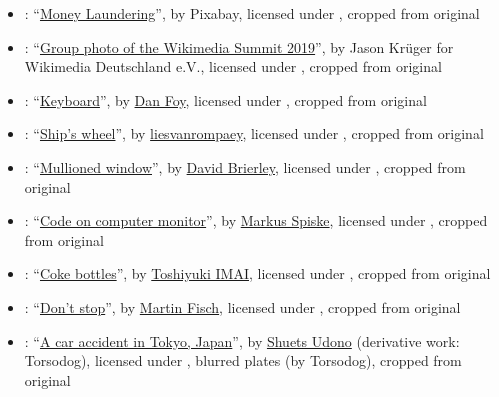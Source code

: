 \begin{itemize}
\item {}: ``\href{https://commons.wikimedia.org/wiki/File:Money_in_notes.jpg}{Money Laundering}'', by Pixabay, licensed under , cropped from original

\item {}: ``\href{https://commons.wikimedia.org/wiki/File:Wikimedia_Summit_2019_-_Group_photo_1.jpg}{Group photo of the Wikimedia Summit 2019}'', by Jason Krüger for Wikimedia Deutschland e.V., licensed under , cropped from original

\item {}: ``\href{https://www.flickr.com/photos/orangeacid/204145200/}{Keyboard}'', by \href{https://www.flickr.com/people/orangeacid/}{Dan Foy}, licensed under , cropped from original

\item {}: ``\href{https://www.flickr.com/photos/liesvanrompaey/4999951854/}{Ship's wheel}'', by \href{https://www.flickr.com/people/liesvanrompaey/}{liesvanrompaey}, licensed under , cropped from original

\item {}: ``\href{https://www.flickr.com/photos/10413717@N08/9255897859/}{Mullioned window}'', by \href{https://www.flickr.com/people/10413717@N08/}{David Brierley}, licensed under , cropped from original

\item {}: ``\href{https://commons.wikimedia.org/wiki/File:Code_on_computer_monitor_(Unsplash).jpg}{Code on computer monitor}'', by \href{https://unsplash.com/@markusspiske}{Markus Spiske}, licensed under , cropped from original

\item {}: ``\href{https://commons.wikimedia.org/wiki/File:Coke_bottles_(336197108).jpg}{Coke bottles}'', by \href{https://www.flickr.com/people/12173213@N00}{Toshiyuki IMAI}, licensed under , cropped from original

\item {}: ``\href{https://www.flickr.com/photos/marfis75/24877162894/}{Don't stop}'', by \href{https://www.flickr.com/people/marfis75/}{Martin Fisch}, licensed under , cropped from original

\item {}: ``\href{https://commons.wikimedia.org/wiki/File:Japanese_car_accident_blur.jpg}{A car accident in Tokyo, Japan}'', by \href{https://www.flickr.com/people/udono/}{Shuets Udono} (derivative work: Torsodog), licensed under , blurred plates (by Torsodog), cropped from original


\end{itemize}
